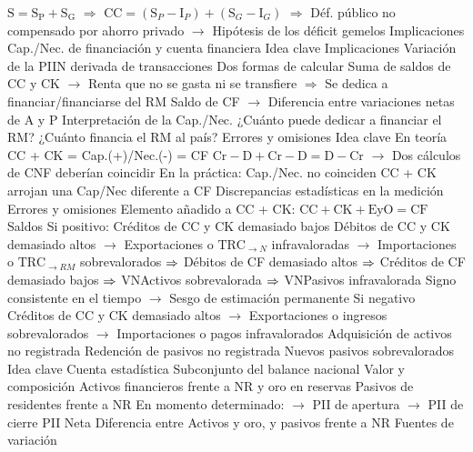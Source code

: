 \documentclass{nuevotema}
\begin{document}
\begin{esquemal}
				\4[] $\text{S} = \text{S}_\text{P} + \text{S}_\text{G}$
				\4[] $\Rightarrow$ $\text{CC} = (\text{S}_P - \text{I}_P) + (\text{S}_G - \text{I}_G)$
				\4[] $\Rightarrow$ Déf. público no compensado por ahorro privado $\to$ Hipótesis de los déficit gemelos
			\3 Implicaciones
		\2 Cap./Nec. de financiación y cuenta financiera
			\3 Idea clave
			\3 Implicaciones
				\4 Variación de la PIIN derivada de transacciones
				\4 Dos formas de calcular
				\4[] Suma de saldos de CC y CK
				\4[] $\to$ Renta que no se gasta ni se transfiere
				\4[] $\Rightarrow$ Se dedica a financiar/financiarse del RM
				\4[] Saldo de CF
				\4[] $\to$ Diferencia entre variaciones netas de A y P
				\4 Interpretación de la Cap./Nec.
				\4[] ¿Cuánto puede dedicar a financiar el RM?
				\4[] ¿Cuánto financia el RM al país?
		\2 Errores y omisiones
			\3 Idea clave
				\4 En teoría CC + CK = Cap.(+)/Nec.(-) = CF
				\4[] $\text{Cr} - \text{D} + \text{Cr} - \text{D} = \text{D} - \text{Cr}$
				\4[] $\to$ Dos cálculos de CNF deberían coincidir
				\4 En la práctica:
				\4[] Cap./Nec. no coinciden
				\4[] CC + CK arrojan una Cap/Nec diferente a CF
				\4[$\Rightarrow$] Discrepancias estadísticas en la medición
				\4 Errores y omisiones
				\4[] Elemento añadido a CC + CK:
				\4[] $\text{CC} + \text{CK} + \text{EyO} = \text{CF}$
			\3 Saldos
				\4 Si positivo:
				\4[] Créditos de CC y CK demasiado bajos
				\4[] Débitos de CC y CK demasiado altos
				\4[] $\to$ Exportaciones o $\text{TRC}_{\to N}$ infravaloradas
				\4[] $\to$ Importaciones o $\text{TRC}_{\to RM}$ sobrevalorados
				\4[] $\Rightarrow$ Débitos de CF demasiado altos
				\4[] $\Rightarrow$ Créditos de CF demasiado bajos
				\4[] $\Rightarrow$ VNActivos sobrevalorada
				\4[] $\Rightarrow$ VNPasivos infravalorada
				\4[] Signo consistente en el tiempo
				\4[] $\to$ Sesgo de estimación permanente
				\4 Si negativo
				\4[] Créditos de CC y CK demasiado altos
				\4[] $\to$ Exportaciones o ingresos sobrevalorados
				\4[] $\to$ Importaciones o pagos infravalorados
				\4[] Adquisición de activos no registrada
				\4[] Redención de pasivos no registrada
				\4[] Nuevos pasivos sobrevalorados
	\1 
		\2 Idea clave
			\3 Cuenta estadística
				\4 Subconjunto del balance nacional
				\4 Valor y composición
				\4[1] Activos financieros frente a NR y oro en reservas
				\4[2] Pasivos de residentes frente a NR
				\4 En momento determinado:
				\4[] $\to$ PII de apertura
				\4[] $\to$ PII de cierre
				\4 PII Neta
				\4[] Diferencia entre Activos y oro, y pasivos frente a NR
			\3 Fuentes de variación

\end{esquemal}
\end{document}
